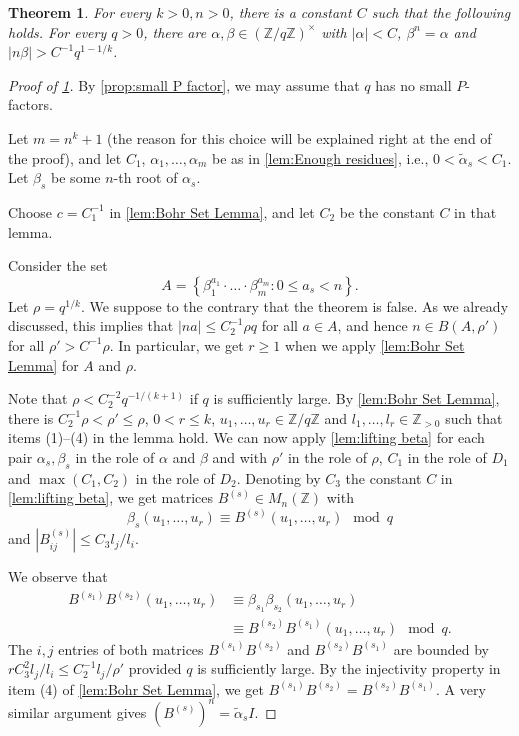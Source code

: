 \documentclass[10pt,a4paper]{amsart}
\newtheorem{theorem}{Theorem}
\newcommand{\Z}{\mathbb{Z}}
\newcommand{\wt}{\widetilde}
\begin{document}
\begin{theorem}\label{thm:large roots}
	For every $k>0,n>0$, there is a constant $C$ such that the following holds.
	For every $q>0$, there are $\alpha,\beta\in(\Z/q\Z)^\times$ with
	$|\alpha|<C$, $\beta^{n}=\alpha$ and $|n\beta|>C^{-1}q^{1-1/k}$.
\end{theorem}

\begin{proof}[Proof of \cref{thm:large roots}]
By \cref{prop:small P factor}, we may assume that $q$ has no small $P$-factors. 
	
Let $m=n^{k}+1$ (the reason for this choice will be explained right at the end of the proof), and let $C_1$,
$\alpha_{1},\ldots,\alpha_{m}$ be as in \cref{lem:Enough residues}, i.e., $0<\wt\alpha_{s}<C_1$. Let $\beta_{s}$ be some $n$-th root of $\alpha_{s}$. 

Choose $c=C_1^{-1}$ in \cref{lem:Bohr Set Lemma}, and let $C_2$ be the constant
$C$ in that lemma.
	
Consider the set 
\[
A=\left\{ \beta_{1}^{a_{1}}\cdot\ldots\cdot\beta_{m}^{a_{m}}:0\le a_{s}<n\right\} .
\]
Let $\rho=q^{1/k}$. 
We suppose to the contrary that the theorem is false.
As we already discussed, this implies that $\lvert n a\rvert \le C_2^{-1}\rho q$ for all $a\in A$,
and hence $n\in B(A,\rho')$ for all $\rho'>C^{-1}\rho$.
In particular, we get $r\ge 1$ when we apply \cref{lem:Bohr Set Lemma}
for $A$ and $\rho$.


Note that $\rho<C_2^{-2}q^{-1/(k+1)}$ if $q$ is sufficiently large.
By \cref{lem:Bohr Set Lemma}, there is $C_2^{-1}\rho<\rho'\le\rho$, $0<r\le k$,
$u_{1},\ldots,u_{r}\in \Z/q\Z$ and $l_{1},\ldots,l_{r}\in \Z_{>0}$ such that 
items (1)--(4) in the lemma hold.
We can now apply \cref{lem:lifting beta} for each pair $\alpha_s, \beta_s$ in the
role of $\alpha$ and $\beta$ and with $\rho'$ in the role of $\rho$, $C_1$ in the role of $D_1$
and $\max(C_1,C_2)$
in the role of $D_2$.
Denoting by $C_3$ the constant $C$ in \cref{lem:lifting beta}, we get
matrices $B^{(s)} \in M_n(\Z)$ with
\[
\beta_s(u_1,\ldots, u_r)\equiv B^{(s)}(u_1,\ldots, u_r) \mod q
\]
and $|B^{(s)}_{ij}|\le C_3l_j/l_i$.

We observe that
\begin{align*}
B^{(s_1)}B^{(s_2)}(u_1,\ldots, u_r)&\equiv\beta_{s_1}\beta_{s_2}(u_1,\ldots, u_r) \\
&\equiv B^{(s_2)}B^{(s_1)}(u_1,\ldots, u_r) \mod q.    
\end{align*}
The $i,j$ entries of both matrices $B^{(s_1)}B^{(s_2)}$ and $B^{(s_2)}B^{(s_1)}$
are bounded by $rC_3^2l_j/l_i\le C_2^{-1} l_j/\rho'$ provided $q$ is sufficiently large.
By the injectivity property in item (4) of \cref{lem:Bohr Set Lemma},
we get $B^{(s_1)}B^{(s_2)}=B^{(s_2)}B^{(s_1)}$.
A very similar argument gives $(B^{(s)})^n=\wt\alpha_sI$.


\end{proof}
\end{document}
